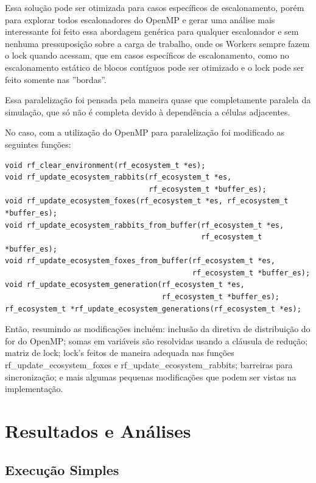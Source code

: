 \documentclass{article}
\begin{document}
Essa solução pode ser otimizada para casos específicos de escalonamento, porém para explorar todos escalonadores do OpenMP e gerar uma análise mais interessante foi feito essa abordagem genérica para qualquer escalonador e sem nenhuma pressuposição sobre a carga de trabalho, onde os Workers sempre fazem o lock quando acessam, que em casos específicos de escalonamento, como no escalonamento estático de blocos contíguos pode ser otimizado e o lock pode ser feito somente nas ''bordas''.

Essa paralelização foi pensada pela maneira quase que completamente paralela da simulação, que só não é completa devido à dependência a células adjacentes.

No caso, com a utilização do OpenMP para paralelização foi modificado as seguintes funções:

\begin{verbatim}
void rf_clear_environment(rf_ecosystem_t *es);
void rf_update_ecosystem_rabbits(rf_ecosystem_t *es,
                                 rf_ecosystem_t *buffer_es);
void rf_update_ecosystem_foxes(rf_ecosystem_t *es, rf_ecosystem_t *buffer_es);
void rf_update_ecosystem_rabbits_from_buffer(rf_ecosystem_t *es,
                                             rf_ecosystem_t *buffer_es);
void rf_update_ecosystem_foxes_from_buffer(rf_ecosystem_t *es,
                                           rf_ecosystem_t *buffer_es);
void rf_update_ecosystem_generation(rf_ecosystem_t *es,
                                    rf_ecosystem_t *buffer_es);
rf_ecosystem_t *rf_update_ecosystem_generations(rf_ecosystem_t *es);
      \end{verbatim}


Então, resumindo as modificações incluém: inclusão da diretiva de distribuição do for do OpenMP; somas em variáveis são resolvidas usando a cláusula de redução; matriz de lock; lock's feitos de maneira adequada nas funções
rf\_update\_ecosystem\_foxes e
rf\_update\_ecosystem\_rabbits; barreiras para sincronização; e mais algumas pequenas modificações que podem ser vistas na implementação.





\section{Resultados e Análises}
\subsection{Execução Simples}
\end{document}
